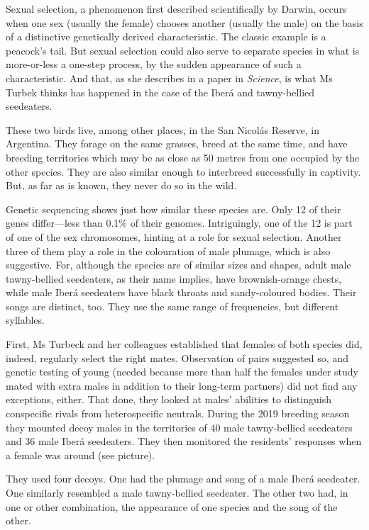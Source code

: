 \documentclass{article}
\begin{document}
Sexual selection, a phenomenon first described scientifically by Darwin, occurs when one sex (usually the female) chooses another (usually the male) on the basis of a distinctive genetically derived characteristic. The classic example is a peacock's tail. But sexual selection could also serve to separate species in what is more-or-less a one-step process, by the sudden appearance of such a characteristic. And that, as she describes in a paper in \emph{Science}, is what Ms Turbek thinks has happened in the case of the Iberá and tawny-bellied seedeaters. 

These two birds live, among other places, in the San Nicolás Reserve, in Argentina. They forage on the same grasses, breed at the same time, and have breeding territories which may be as close as 50 metres from one occupied by the other species. They are also similar enough to interbreed successfully in captivity. But, as far as is known, they never do so in the wild. 

Genetic sequencing shows just how similar these species are. Only 12 of their genes differ---less than 0.1\% of their genomes. Intriguingly, one of the 12 is part of one of the sex chromosomes, hinting at a role for sexual selection. Another three of them play a role in the colouration of male plumage, which is also suggestive. For, although the species are of similar sizes and shapes, adult male tawny-bellied seedeaters, as their name implies, have brownish-orange chests, while male Iberá seedeaters have black throats and sandy-coloured bodies. Their songs are distinct, too. They use the same range of frequencies, but different syllables. 

First, Ms Turbeck and her colleagues established that females of both species did, indeed, regularly select the right mates. Observation of pairs suggested so, and genetic testing of young (needed because more than half the females under study mated with extra males in addition to their long-term partners) did not find any exceptions, either. That done, they looked at males' abilities to distinguish conspecific rivals from heterospecific neutrals. During the 2019 breeding season they mounted decoy males in the territories of 40 male tawny-bellied seedeaters and 36 male Iberá seedeaters. They then monitored the residents' responses when a female was around (see picture). 

They used four decoys. One had the plumage and song of a male Iberá seedeater. One similarly resembled a male tawny-bellied seedeater. The other two had, in one or other combination, the appearance of one species and the song of the other. 
\end{document}
